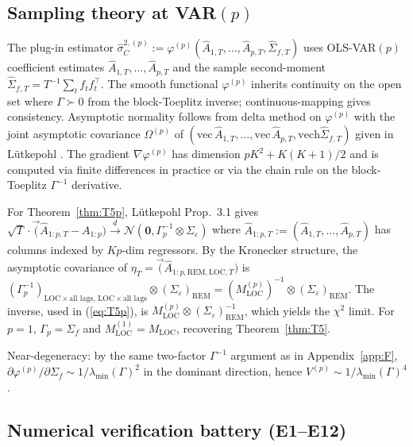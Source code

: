 \documentclass[11pt,letterpaper]{article}
\theoremstyle{remark}
\newcommand{\REM}{\mathrm{REM}}
\newcommand{\LOC}{\mathrm{LOC}}
\newcommand{\Sigmaf}{\Sigma_f}
\newcommand{\Sigmae}{\Sigma_\varepsilon}
\newcommand{\Mloc}{M_{\LOC}}
\newcommand{\vech}{\mathrm{vech}}
\begin{document}
\subsection{Sampling theory at VAR$(p)$}

The plug-in estimator $\widehat\sigma^{2,(p)}_C := \varphi^{(p)}(\widehat A_{1, T}, \ldots, \widehat A_{p, T}, \widehat \Sigmaf{}_{,T})$ uses OLS-VAR$(p)$ coefficient estimates $\widehat A_{1, T}, \ldots, \widehat A_{p, T}$ and the sample second-moment $\widehat\Sigmaf{}_{,T} = T^{-1} \sum_t f_t f_t^\top$. The smooth functional $\varphi^{(p)}$ inherits continuity on the open set where $\Gamma \succ 0$ from the block-Toeplitz inverse; continuous-mapping gives consistency. Asymptotic normality follows from delta method on $\varphi^{(p)}$ with the joint asymptotic covariance $\Omega^{(p)}$ of $(\mathrm{vec}\,\widehat A_{1, T}, \ldots, \mathrm{vec}\,\widehat A_{p, T}, \vech\widehat\Sigmaf{}_{,T})$ given in L\"utkepohl \cite[Prop.~3.2, Ch.~3.4]{Lutkepohl2005}. The gradient $\nabla \varphi^{(p)}$ has dimension $p K^2 + K(K+1)/2$ and is computed via finite differences in practice or via the chain rule on the block-Toeplitz $\Gamma^{-1}$ derivative.

For Theorem~\ref{thm:T5p}, L\"utkepohl Prop.~3.1 gives $\sqrt{T} \cdot \vec(\widehat A_{1:p, T} - A_{1:p}) \xrightarrow{d} \mathcal{N}(\mathbf{0}, \Gamma_p^{-1} \otimes \Sigmae)$ where $\widehat A_{1:p, T} := (\widehat A_{1, T}, \ldots, \widehat A_{p, T})$ has columns indexed by $Kp$-dim regressors. By the Kronecker structure, the asymptotic covariance of $\eta_T = \vec(\widehat A_{1:p, \REM, \LOC, T})$ is $(\Gamma_p^{-1})_{\LOC \times \text{all lags},\,\LOC \times \text{all lags}} \otimes (\Sigmae)_\REM = (M_\LOC^{(p)})^{-1} \otimes (\Sigmae)_\REM$. The inverse, used in (\ref{eq:T5p}), is $M_\LOC^{(p)} \otimes (\Sigmae)_\REM^{-1}$, which yields the $\chi^2$ limit. For $p = 1$, $\Gamma_p = \Sigmaf$ and $M_\LOC^{(1)} = \Mloc$, recovering Theorem~\ref{thm:T5}.

Near-degeneracy: by the same two-factor $\Gamma^{-1}$ argument as in Appendix~\ref{app:F}, $\partial \varphi^{(p)} / \partial \Sigmaf \sim 1/\lambda_{\min}(\Gamma)^2$ in the dominant direction, hence $V^{(p)} \sim 1/\lambda_{\min}(\Gamma)^4$.

\subsection{Numerical verification battery (E1--E12)}\label{app:VARp_tables}
\end{document}
